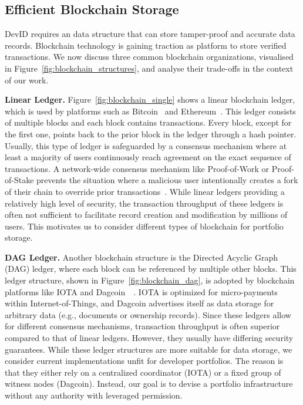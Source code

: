 \subsection{Efficient Blockchain Storage}
\label{subsec:scalable_blockchain}
DevID requires an data structure that can store tamper-proof and accurate data records.
Blockchain technology is gaining traction as platform to store verified transactions.
We now discuss three common blockchain organizations, visualised in Figure~\ref{fig:blockchain_structures}, and analyse their trade-offs in the context of our work.

\textbf{Linear Ledger.} Figure~\ref{fig:blockchain_single} shows a linear blockchain ledger, which is used by platforms such as Bitcoin~\cite{nakamoto2008bitcoin} and Ethereum~\cite{wood2014ethereum}.
This ledger consists of multiple blocks and each block contains transactions.
Every block, except for the first one, points back to the prior block in the ledger through a hash pointer.
Usually, this type of ledger is safeguarded by a consensus mechanism where at least a majority of users continuously reach agreement on the exact sequence of transactions.
A network-wide consensus mechanism like Proof-of-Work or Proof-of-Stake prevents the situation where a malicious user intentionally creates a fork of their chain to override prior transactions~\cite{vukolic2015quest}.
While linear ledgers providing a relatively high level of security, the transaction throughput of these ledgers is often not sufficient to facilitate record creation and modification by millions of users.
This motivates us to consider different types of blockchain for portfolio storage.

\textbf{DAG Ledger.} Another blockchain structure is the Directed Acyclic Graph (DAG) ledger, where each block can be referenced by multiple other blocks.
This ledger structure, shown in Figure~\ref{fig:blockchain_dag}, is adopted by blockchain platforms like IOTA and Dagcoin~\cite{popov2018tangle}~\cite{lerner2015dagcoin}.
IOTA is optimized for micro-payments within Internet-of-Things, and Dagcoin advertises itself as data storage for arbitrary data (e.g., documents or ownership records).
Since these ledgers allow for different consensus mechanisms, transaction throughput is often superior compared to that of linear ledgers.
However, they usually have differing security guarantees.
While these ledger structures are more suitable for data storage, we consider current implementations unfit for developer portfolios.
The reason is that they either rely on a centralized coordinator (IOTA) or a fixed group of witness nodes (Dagcoin).
Instead, our goal is to devise a portfolio infrastructure without any authority with leveraged permission.

